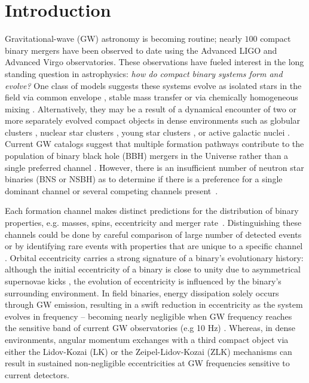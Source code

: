 \documentclass[floatfix,lengthcheck,showpacs,amssymb,amsmath,amsfonts,twocolumn,nofootinbib,longbibliography]{revtex4-1}
\begin{document}
\section{Introduction}
Gravitational-wave (GW) astronomy is becoming routine; nearly $100$ compact binary mergers have been observed to date \cite{Nitz:2021zwj,LIGOScientific:2021djp,Olsen:2022pin} using the Advanced LIGO  \cite{LIGOScientific:2014pky} and Advanced Virgo \cite{Acernese:2015gua} observatories. These observations have fueled interest in the long standing question in astrophysics: \textit{how do compact binary systems form and evolve?} One class of models suggests these systems evolve as isolated stars in the field via common envelope \cite{Belczynski:2001uc, Mennekens:2013dja, Chu:2021evh}, stable mass transfer \cite{Klencki:2021hxe,vandenHeuvel:2017pwp} or via chemically homogeneous mixing \cite{Mandel:2015qlu, Marchant:2016wow}. Alternatively, they may be a result of a dynamical encounter of two or more separately evolved compact objects in dense environments such as globular clusters \cite{Vesperini:2010zi,Fragione:2018vty, Rodriguez:2017pec,Sedda:2020wzl}, nuclear star clusters \cite{Fragione:2018yrb, Wang:2020jsx}, young star clusters \cite{Banerjee:2020qub, Santoliquido:2020bry}, or active galactic nuclei \cite{Bartos:2016dgn, Tagawa:2020qll}.
Current GW catalogs suggest that multiple formation pathways contribute to the population of binary black hole (BBH) mergers in the Universe rather than a single preferred channel \cite{Zevin:2020gbd,KAGRA:2021duu}. However, there is an insufficient number of neutron star binaries (BNS or NSBH) as to determine if there is a preference for a single dominant channel or several competing channels present~\cite{KAGRA:2021duu,Belczynski:2017mqx}.


Each formation channel makes distinct predictions for the distribution of binary properties, e.g. masses, spins, eccentricity and merger rate~\cite{Mandel:2021smh}. Distinguishing these channels could be done by careful comparison of large number of detected events or by identifying rare events with properties that are unique to a specific channel \cite{Zevin:2020gbd,Zevin:2021rtf}. Orbital eccentricity carries a strong signature of a binary's evolutionary history: although the initial eccentricity of a binary is close to unity due to asymmetrical supernovae kicks  \cite{Hobbs:2005yx, Verbunt:2017zqi}, the evolution of eccentricity is influenced by the binary's surrounding environment.  In field binaries, energy dissipation solely occurs through GW emission, resulting in a swift reduction in eccentricity as the system evolves in frequency -- becoming nearly negligible when GW frequency reaches the sensitive band of current GW observatories (e.g 10 Hz) \cite{Peters:1964zz}. Whereas, in dense environments, angular momentum exchanges with a third compact object via either the Lidov-Kozai (LK) \cite{LIDOV1962719,Kozai:1962zz} or the Zeipel-Lidov-Kozai (ZLK) mechanisms \cite{Antognini:2015loa} can result in sustained non-negligible eccentricities at GW frequencies sensitive to current detectors. 
\end{document}
